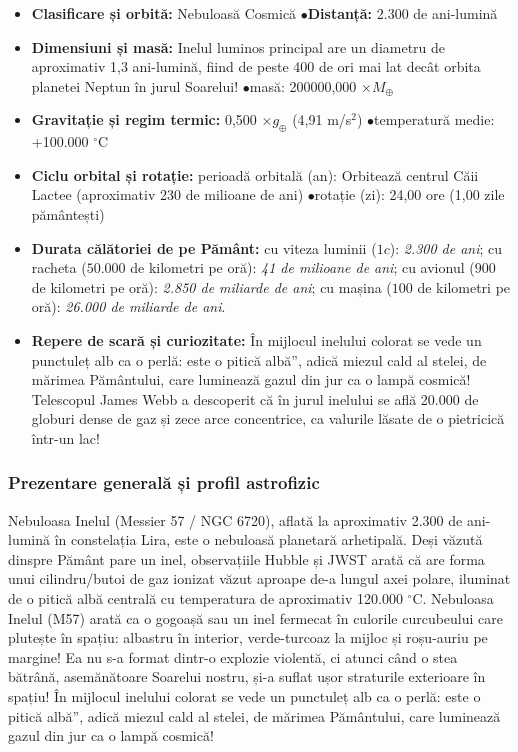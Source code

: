 \begin{tcolorbox}[orbitardata, title={\textbf{Repere esențiale: Nebuloasa Inelul (M57)}}]
\small
\begin{itemize}[leftmargin=1.4em, itemsep=2pt, topsep=2pt]
  \item \textbf{Clasificare și orbită:} Nebuloasă Cosmică \quad$\bullet$\quad \textbf{Distanță:} 2.300 de ani-lumină
  \item \textbf{Dimensiuni și masă:} Inelul luminos principal are un diametru de aproximativ 1,3 ani-lumină, fiind de peste 400 de ori mai lat decât orbita planetei Neptun în jurul Soarelui! \quad$\bullet$\quad masă: 200000,000 $\times M_\oplus$
  \item \textbf{Gravitație și regim termic:} 0,500 $\times g_\oplus$ (4,91 m/s$^2$) \quad$\bullet$\quad temperatură medie: +100.000 $^\circ$C
  \item \textbf{Ciclu orbital și rotație:} perioadă orbitală (an): Orbitează centrul Căii Lactee (aproximativ 230 de milioane de ani) \quad$\bullet$\quad rotație (zi): 24,00 ore (1,00 zile pământești)
  \item \textbf{Durata călătoriei de pe Pământ:} cu viteza luminii ($1c$): \emph{2.300 de ani}; cu racheta ($50.000$ de kilometri pe oră): \emph{41 de milioane de ani}; cu avionul ($900$ de kilometri pe oră): \emph{2.850 de miliarde de ani}; cu mașina ($100$ de kilometri pe oră): \emph{26.000 de miliarde de ani}.
  \item \textbf{Repere de scară și curiozitate:} În mijlocul inelului colorat se vede un punctuleț alb ca o perlă: este o \quotedblbase{}pitică albă\textquotedblright{}, adică miezul cald al stelei, de mărimea Pământului, care luminează gazul din jur ca o lampă cosmică! Telescopul James Webb a descoperit că în jurul inelului se află 20.000 de globuri dense de gaz și zece arce concentrice, ca valurile lăsate de o pietricică într-un lac!
\end{itemize}
\end{tcolorbox}

\subsubsection*{Prezentare generală și profil astrofizic}
Nebuloasa Inelul (Messier 57 / NGC 6720), aflată la aproximativ 2.300 de ani-lumină în constelația Lira, este o nebuloasă planetară arhetipală. Deși văzută dinspre Pământ pare un inel, observațiile Hubble și JWST arată că are forma unui cilindru/butoi de gaz ionizat văzut aproape de-a lungul axei polare, iluminat de o pitică albă centrală cu temperatura de aproximativ 120.000 $^\circ$C. Nebuloasa Inelul (M57) arată ca o gogoașă sau un inel fermecat în culorile curcubeului care plutește în spațiu: albastru în interior, verde-turcoaz la mijloc și roșu-auriu pe margine! Ea nu s-a format dintr-o explozie violentă, ci atunci când o stea bătrână, asemănătoare Soarelui nostru, și-a suflat ușor straturile exterioare în spațiu! În mijlocul inelului colorat se vede un punctuleț alb ca o perlă: este o \quotedblbase{}pitică albă\textquotedblright{}, adică miezul cald al stelei, de mărimea Pământului, care luminează gazul din jur ca o lampă cosmică!

